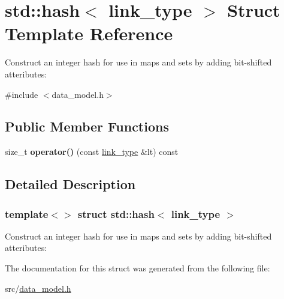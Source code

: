 \hypertarget{structstd_1_1hash_3_01link__type_01_4}{}\section{std\+:\+:hash$<$ link\+\_\+type $>$ Struct Template Reference}
\label{structstd_1_1hash_3_01link__type_01_4}


Construct an integer hash for use in maps and sets by adding bit-\/shifted atteributes\+:  




{\ttfamily \#include $<$data\+\_\+model.\+h$>$}

\subsection*{Public Member Functions}
\begin{DoxyCompactItemize}
\item 
\mbox{\label{structstd_1_1hash_3_01link__type_01_4_a20be12b656a0b779b9b18ebf4b89edaf}} 
size\+\_\+t {\bfseries operator()} (const \hyperlink{structtricl_1_1link__type}{link\+\_\+type} \&lt) const
\end{DoxyCompactItemize}


\subsection{Detailed Description}
\subsubsection*{template$<$$>$\newline
struct std\+::hash$<$ link\+\_\+type $>$}

Construct an integer hash for use in maps and sets by adding bit-\/shifted atteributes\+: 

The documentation for this struct was generated from the following file\+:\begin{DoxyCompactItemize}
\item 
src/\hyperlink{data__model_8h}{data\+\_\+model.\+h}\end{DoxyCompactItemize}
